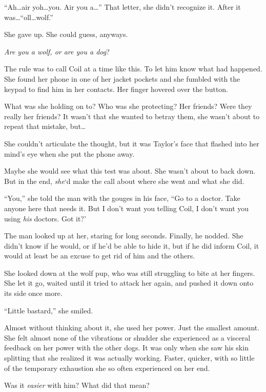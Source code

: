 ``Ah\ldots air yoh\ldots you.  Air you a\ldots''  That letter, she didn't recognize it.  After it was\ldots ``oll\ldots wolf.''



She gave up.  She could guess, anyways.



\emph{Are you a wolf, or are you a dog}?



The rule was to call Coil at a time like this.  To let him know what had happened.  She found her phone in one of her jacket pockets and she fumbled with the keypad to find him in her contacts.  Her finger hovered over the button.



What was she holding on to?  Who was she protecting?  Her friends?  Were they really her friends?  It wasn't that she wanted to betray them, she wasn't about to repeat that mistake, but\ldots



She couldn't articulate the thought, but it was Taylor's face that flashed into her mind's eye when she put the phone away.



Maybe she would see what this test was about.  She wasn't about to back down.  But in the end, \emph{she}`d make the call about where she went and what she did.



``You,'' she told the man with the gouges in his face, ``Go to a doctor.  Take anyone here that needs it.  But I don't want you telling Coil, I don't want you using \emph{his} doctors.  Got it?'



The man looked up at her, staring for long seconds.  Finally, he nodded.  She didn't know if he would, or if he'd be able to hide it, but if he did inform Coil, it would at least be an excuse to get rid of him and the others.



She looked down at the wolf pup, who was still struggling to bite at her fingers.  She let it go, waited until it tried to attack her again, and pushed it down onto its side once more.



``Little bastard,'' she smiled.



Almost without thinking about it, she used her power.  Just the smallest amount.  She felt almost none of the vibrations or shudder she experienced as a visceral feedback on her power with the other dogs.  It was only when she saw his skin splitting that she realized it was actually working.  Faster, quicker, with so little of the temporary exhaustion she so often experienced on her end.



Was it \emph{easier} with him?  What did that mean?





